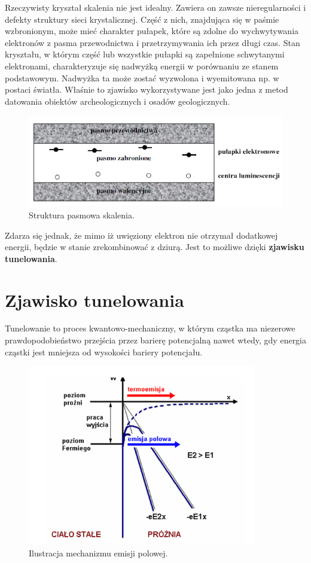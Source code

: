 Rzeczywisty kryształ skalenia nie jest idealny. Zawiera on zawsze nieregularności i defekty struktury sieci krystalicznej. Część z nich, znajdująca się w paśmie wzbronionym, może mieć charakter pułapek, które są zdolne do wychwytywania
elektronów z pasma przewodnictwa i przetrzymywania ich przez długi czas. Stan kryształu, w którym część lub wszystkie pułapki są zapełnione schwytanymi elektronami,
charakteryzuje się nadwyżką energii w porównaniu ze stanem podstawowym.  Nadwyżka ta może zostać wyzwolona i wyemitowana np. w postaci światła. Właśnie to zjawisko wykorzystywane jest jako jedna z metod datowania obiektów archeologicznych
i osadów geologicznych. 
\begin{figure}[h]
\centering
\includegraphics[width=15cm]{strukturapasmowa}
\caption{Struktura pasmowa skalenia. \cite{struktura_pasmowa}}
\label{fig:Struktura pasmowa}
\end{figure}

Zdarza się jednak, że mimo iż uwięziony elektron nie otrzymał dodatkowej energii, będzie w stanie zrekombinować z dziurą. Jest to  możliwe dzięki  \textbf{zjawisku tunelowania}.

\section{Zjawisko tunelowania}
Tunelowanie to  proces kwantowo-mechaniczny, w którym cząstka ma niezerowe prawdopodobieństwo przejścia przez barierę potencjalną nawet wtedy, gdy energia cząstki jest mniejsza od wysokości bariery potencjału.


\begin{figure}[H]
\centering
\includegraphics[width=10cm]{tunelowanie}
\caption{Ilustracja mechanizmu emisji polowej. \cite{tunel_pic}}
\label{fig:Tunelowanie}
\end{figure}



